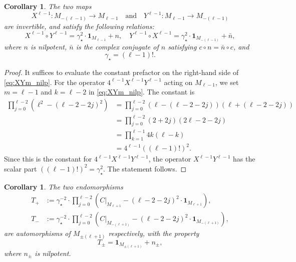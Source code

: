 \documentclass[a4paper,12pt,reqno]{amsart}
\theoremstyle{plain}
\newtheorem{corollary}[theorem]{Corollary}
\theoremstyle{remark}
\begin{document}
  \begin{corollary}\label{cor:X_Y_inverses}
    The two maps
    \[
    X^{\ell-1}\colon M_{-(\ell-1)} \to M_{\ell-1} \quad \text{and} \quad Y^{\ell-1}\colon M_{\ell-1} \to M_{-(\ell-1)}
    \]
    are invertible, and satisfy the following relations:
    \begin{equation} \label{eq:XY_inverses_rel}
      X^{\ell-1} \circ Y^{\ell-1} = \gamma_\star^2 \cdot \mathbf{1}_{M_{\ell-1}} + n, \quad Y^{\ell-1} \circ X^{\ell-1} = \gamma_\star^2 \cdot \mathbf{1}_{M_{-(\ell-1)}} + \bar{n},
    \end{equation}
    where $n$ is nilpotent, $\bar{n}$ is the complex conjugate of $n$ satisfying $c \circ n = \bar{n} \circ c$, and
    \[
    \gamma_\star = (\ell-1)!.
    \]
  \end{corollary}
  \begin{proof}
    It suffices to evaluate the constant prefactor on the right-hand side of \eqref{eq:XYm_nilp}. For the operator $4^{\ell-1}X^{\ell-1}Y^{\ell-1}$ acting on $M_{\ell-1}$, we set $m=\ell-1$ and $k=\ell-2$ in \eqref{eq:XYm_nilp}. The constant is
    \begin{align*}
      \prod_{j=0}^{\ell-2} \left(\ell^2 - (\ell-2-2j)^2\right) &= \prod_{j=0}^{\ell-2} \left(\ell - (\ell-2-2j)\right) \left(\ell + (\ell-2-2j)\right) \\
      &= \prod_{j=0}^{\ell-2} (2+2j) (2\ell-2-2j)\\
      &= \prod_{k=1}^{\ell-1} 4 k (\ell-k) \\
      &= 4^{\ell-1} ((\ell-1)!)^2.
    \end{align*}
    Since this is the constant for $4^{\ell-1}X^{\ell-1}Y^{\ell-1}$, the operator $X^{\ell-1}Y^{\ell-1}$ has the scalar part $((\ell-1)!)^2 = \gamma_\star^2$. The statement follows.
  \end{proof}
  
  \begin{corollary}\label{cor:T_operators}
    The two endomorphisms
    \begin{align}
      T_+ &:= \gamma_\star^{-2} \cdot \prod_{j=0}^{\ell-2} \left(C|_{M_{\ell+1}} - (\ell - 2 - 2j)^2 \cdot \mathbf{1}_{M_{\ell+1}}\right), \label{eq:T_plus_def} \\
      T_- &:= \gamma_\star^{-2} \cdot \prod_{j=0}^{\ell-2} \left(C|_{M_{-(\ell+1)}} - (\ell - 2 - 2j)^2 \cdot \mathbf{1}_{M_{-(\ell+1)}}\right), \label{eq:T_minus_def}
    \end{align}
    are automorphisms of $M_{\pm(\ell+1)}$ respectively, with the property
    \[
    T_{\pm} = \mathbf{1}_{M_{\pm(\ell+1)}} + n_{\pm},
    \]
    where $n_\pm$ is nilpotent.
  \end{corollary}
\end{document}
